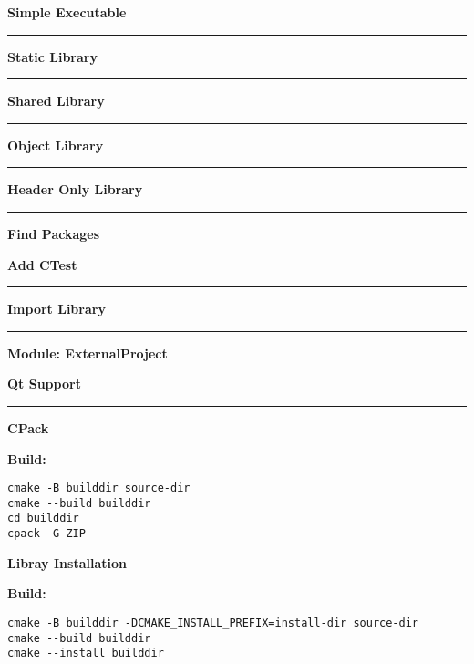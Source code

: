 \documentclass{article}
\begin{document}
\begin{minipage}[t]{0.20\linewidth}
\textbf{Simple Executable}

\noindent\rule{\textwidth}{0.1pt}
\textbf{Static Library}

\noindent\rule{\textwidth}{0.1pt}
\textbf{Shared Library}

\noindent\rule{\textwidth}{0.1pt}
\textbf{Object Library}

\noindent\rule{\textwidth}{0.1pt}
\textbf{Header Only Library}

\noindent\rule{\textwidth}{0.1pt}
\textbf{Find Packages}

\end{minipage}
\hfill\vline\hfill
\begin{minipage}[t]{0.26\linewidth}
\textbf{Add CTest}

\noindent\rule{\textwidth}{0.1pt}
\textbf{Import Library}

\noindent\rule{\textwidth}{0.1pt}
\textbf{Module: ExternalProject}

\end{minipage}
\hfill\vline\hfill
\begin{minipage}[t]{0.20\linewidth}
\textbf{Qt Support}

\noindent\rule{\textwidth}{0.1pt}
\textbf{CPack}

\textbf{Build:}
\begin{verbatim}
cmake -B builddir source-dir
cmake --build builddir
cd builddir
cpack -G ZIP
\end{verbatim}
\end{minipage}
\hfill\vline\hfill
\begin{minipage}[t]{0.25\linewidth}
\textbf{Libray Installation}

\textbf{Build:}
\begin{verbatim}
cmake -B builddir -DCMAKE_INSTALL_PREFIX=install-dir source-dir
cmake --build builddir
cmake --install builddir
\end{verbatim}
\end{minipage}
\end{document}
